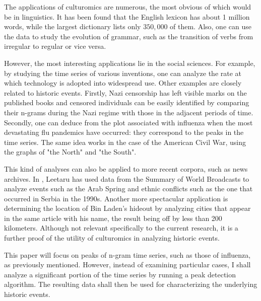 The applications of culturomics are numerous, the most obvious of which would be in linguistics. It has been found that the English lexicon has about 1 million words, while the largest dictionary lists only $350,000$ of them. Also, one can use the data to study the evolution of grammar, such as the transition of verbs from irregular to regular or vice versa.

However, the most interesting applications lie in the social sciences. For example, by studying the time series of various inventions, one can analyze the rate at which technology is adopted into widespread use. Other examples are closely related to historic events. Firstly, Nazi censorship has left visible marks on the published books and censored individuals can be easily identified by comparing their n-grams during the Nazi regime with those in the adjacent periods of time. Secondly, one can deduce from the plot associated with influenza when the most devastating flu pandemics have occurred: they correspond to the peaks in the time series. The same idea works in the case of the American Civil War, using the graphs of "the North" and "the South".

This kind of analyses can also be applied to more recent corpora, such as news archives. In \cite{leetaru11culturomics}, Leetaru has used data from the Summary of World Broadcasts to analyze events such as the Arab Spring and ethnic conflicts such as the one that occurred in Serbia in the 1990s. Another more spectacular application is determining the location of Bin Laden's hideout by analyzing cities that appear in the same article with his name, the result being off by less than 200 kilometers. Although not relevant specifically to the current research, it is a further proof of the utility of culturomics in analyzing historic events.

This paper will focus on peaks of n-gram time series, such as those of influenza, as previously mentioned. However, instead of examining particular cases, I shall analyze a significant portion of the time series by running a peak detection algorithm. The resulting data shall then be used for characterizing the underlying historic events.

